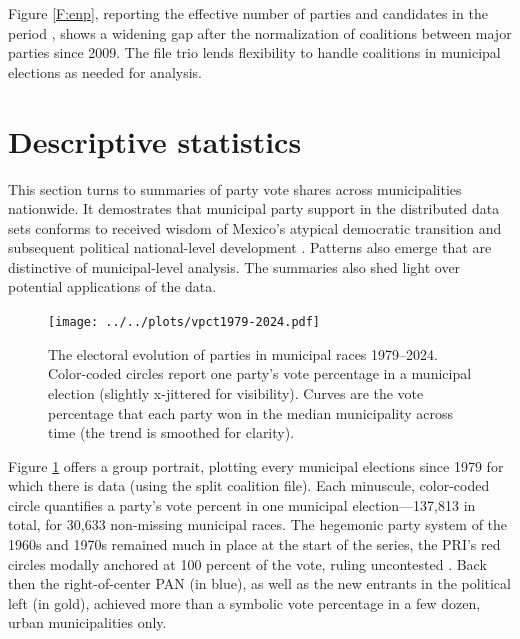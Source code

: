 \documentclass[letter,12pt]{article}
\begin{document}
Figure \ref{F:enp}, reporting the effective number of parties and candidates in the period \citep{laakso.taagepera.1979}, shows a widening gap after the normalization of coalitions between major parties since 2009. The file trio lends flexibility to handle coalitions in municipal elections as needed for analysis. %


\section{Descriptive statistics}

This section turns to summaries of party vote shares across municipalities nationwide. It demostrates that municipal party support in the distributed data sets conforms to received wisdom of Mexico's atypical democratic transition \citep[eg.][]{cornelius.1996} and subsequent political national-level development \citep[eg.][]{diaz-estevez-magaloni-Poverty-book.2016}. Patterns also emerge that are distinctive of municipal-level analysis. The summaries also shed light over potential applications of the data.

\begin{figure}
  \texttt{[image: ../../plots/vpct1979-2024.pdf]}
  \caption{The electoral evolution of parties in municipal races 1979--2024. Color-coded circles report one party's vote percentage in a municipal election (slightly x-jittered for visibility). Curves are the vote percentage that each party won in the median municipality across time (the trend is smoothed for clarity).}\label{F:vpcts}
\end{figure}  

Figure \ref{F:vpcts} offers a group portrait, plotting every municipal elections since 1979 for which there is data (using the split coalition file). Each minuscule, color-coded circle quantifies a party's vote percent in one municipal election---137,813 in total, for 30,633 non-missing municipal races. The hegemonic party system of the 1960s and 1970s remained much in place at the start of the series, the PRI's red circles modally anchored at 100 percent of the vote, ruling uncontested \citep{segovia.els1979}. Back then the right-of-center PAN (in blue), as well as the new entrants in the political left (in gold), achieved more than a symbolic vote percentage in a few dozen, urban municipalities only.
\end{document}
